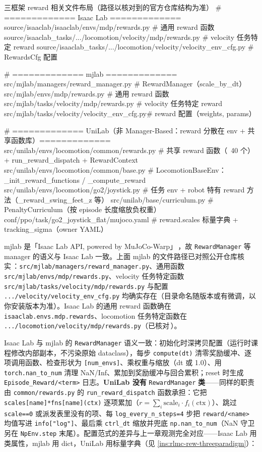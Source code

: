 \begin{codebox}[text]{三框架 reward 相关文件布局（路径以核对到的官方仓库结构为准）}
# ============= Isaac Lab =============
source/isaaclab/isaaclab/envs/mdp/rewards.py                 # 通用 reward 函数
source/isaaclab_tasks/.../locomotion/velocity/mdp/rewards.py # velocity 任务特定 reward
source/isaaclab_tasks/.../locomotion/velocity/velocity_env_cfg.py # RewardsCfg 配置

# ============= mjlab =============
src/mjlab/managers/reward_manager.py        # RewardManager（scale_by_dt）
src/mjlab/envs/mdp/rewards.py               # 通用 reward 函数
src/mjlab/tasks/velocity/mdp/rewards.py     # velocity 任务特定 reward
src/mjlab/tasks/velocity/velocity_env_cfg.py# reward 配置（weights, params）

# ============= UniLab（非 Manager-Based：reward 分散在 env + 共享函数库）=============
src/unilab/envs/locomotion/common/rewards.py      # 共享 reward 函数（~40 个）+ run_reward_dispatch + RewardContext
src/unilab/envs/locomotion/common/base.py         # LocomotionBaseEnv：_init_reward_functions / _compute_reward
src/unilab/envs/locomotion/go2/joystick.py        # 任务 env + robot 特有 reward 方法（_reward_swing_feet_z 等）
src/unilab/base/curriculum.py                      # PenaltyCurriculum（按 episode 长度缩放负权重）
conf/ppo/task/go2_joystick_flat/mujoco.yaml       # reward.scales 标量字典 + tracking_sigma（owner YAML）
\end{codebox}

\begin{note}
mjlab 是「Isaac Lab API, powered by MuJoCo-Warp」\,\cite{mjlab2026}，故 \verb|RewardManager| 等 manager 的语义与 Isaac Lab 一致。上面 mjlab 的文件路径已对照公开仓库核实\,\cite{mjlab2026}：\verb|src/mjlab/managers/reward_manager.py|、通用函数 \verb|src/mjlab/envs/mdp/rewards.py|、velocity 任务特定函数 \verb|src/mjlab/tasks/velocity/mdp/rewards.py| 与配置 \verb|.../velocity/velocity_env_cfg.py| 均确实存在（目录命名随版本或有微调，以你安装版本为准）。Isaac Lab 的通用 reward 函数确在 \verb|isaaclab.envs.mdp.rewards|、locomotion 任务特定函数在 \verb|.../locomotion/velocity/mdp/rewards.py|（已核对\,\cite{isaaclab2024}）。
\end{note}

Isaac Lab 与 mjlab 的 \verb|RewardManager| 语义一致：初始化时深拷贝配置（运行时课程修改内部副本，不污染原始 dataclass），每步 \verb|compute(dt)| 清零奖励缓冲、逐项调用函数、检查形状为 \verb|[num_envs]|、乘权重与缩放（dt 或 1.0）、用 \verb|torch.nan_to_num| 清理 NaN/Inf、累加到奖励缓冲与回合累积；reset 时生成 \verb|Episode_Reward/<term>| 日志。\textbf{UniLab 没有} \verb|RewardManager| \textbf{类}——同样的职责由 \verb|common/rewards.py| 的 \verb|run_reward_dispatch| 函数承担：它把 \verb|scales[name]*fns[name](ctx)| 逐项累加（$r=\sum_i \text{scale}_i\cdot f_i(\text{ctx})$）、跳过 \verb|scale==0| 或派发表里没有的项、每 \verb|log_every_n_steps=4| 步把 \verb|reward/<name>| 均值写进 \verb|info["log"]|、最后乘 \verb|ctrl_dt| 缩放并兜底 \verb|np.nan_to_num|（NaN 守卫另在 \verb|NpEnv.step| 末尾）。配置范式的差异与上一章观测完全对应——Isaac Lab 用类属性，mjlab 用 dict，UniLab 用标量字典（见 \cref{ins:rlmc-rew-threeparadigm}）：


